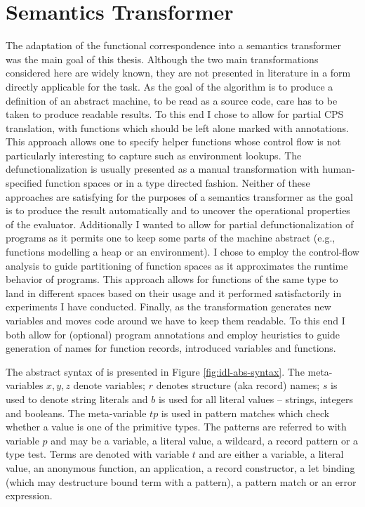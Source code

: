 \chapter{Semantics Transformer}\label{chapter:transformer}
The adaptation of the functional correspondence into a semantics transformer was the main goal of this thesis.
Although the two main transformations considered here are widely known, they are not presented in literature in a form directly applicable for the task.
As the goal of the algorithm is to produce a definition of an abstract machine, to be read as a source code, care has to be taken to produce readable results.
To this end I chose to allow for partial CPS translation, with functions which should be left alone marked with annotations.
This approach allows one to specify helper functions whose control flow is not particularly interesting to capture such as environment lookups.
The defunctionalization is usually presented as a manual transformation with human-specified function spaces or in a type directed fashion.
Neither of these approaches are satisfying for the purposes of a semantics transformer as the goal is to produce the result automatically and to uncover the operational properties of the evaluator.
Additionally I wanted to allow for partial defunctionalization of programs as it permits one to keep some parts of the machine abstract (e.g., functions modelling a heap or an environment).
I chose to employ the control-flow analysis to guide partitioning of function spaces as it approximates the runtime behavior of programs.
This approach allows for functions of the same type to land in different spaces based on their usage and it performed satisfactorily in experiments I have conducted.
Finally, as the transformation generates new variables and moves code around we have to keep them readable.
To this end I both allow for (optional) program annotations and employ heuristics to guide generation of names for function records, introduced variables and functions.

The abstract syntax of \IDL{} is presented in Figure \ref{fig:idl-abs-syntax}.
The meta-variables $x, y, z$ denote variables; $r$ denotes structure (aka record) names; $s$ is used to denote string literals and $b$ is used for all literal values -- strings, integers and booleans.
The meta-variable $\mathit{tp}$ is used in pattern matches which check whether a value is one of the primitive types.
The patterns are referred to with variable $p$ and may be a variable, a literal value, a wildcard, a record pattern or a type test.
Terms are denoted with variable $t$ and are either a variable, a literal value, an anonymous function, an application, a record constructor, a let binding (which may destructure bound term with a pattern), a pattern match or an error expression.


